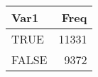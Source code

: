 
\begin{tabular}[t]{lr}
\toprule
Var1 & Freq\\
\midrule
TRUE & 11331\\
FALSE & 9372\\
\bottomrule
\end{tabular}